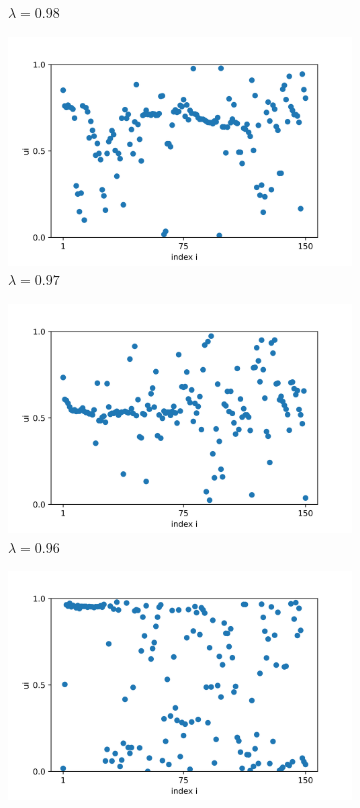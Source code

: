 \documentclass[a4paper,12pt]{article}
\begin{document}
\begin{figure}[H]
\begin{subfigure}{.32\textwidth}
  \caption{$\lambda=0.98$}
\end{subfigure}
\begin{subfigure}{.32\textwidth}
  \centering
  \includegraphics[width=1\linewidth]{u_lambda=0.97_t=2000.png}  
  \caption{$\lambda=0.97$}
\end{subfigure}
\hfill
\begin{subfigure}{.32\textwidth}
  \centering
  \includegraphics[width=1\linewidth]{u_lambda=0.96_t=2000.png}  
  \caption{$\lambda=0.96$}
\end{subfigure}
\hfill
\begin{subfigure}{.32\textwidth}
  \centering
  \includegraphics[width=1\linewidth]{u_lambda=0.95_t=2000.png}  

\end{subfigure}
\end{figure}
\end{document}
